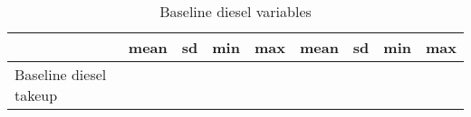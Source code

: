 \begin{table}[htbp]\centering
\def\sym#1{\ifmmode^{#1}\else\(^{#1}\)\fi}
\caption{Baseline diesel variables\label {tab1}}
\begin{tabular}{l*{2}{cccc}}
\toprule
                    &        mean&          sd&         min&         max&        mean&          sd&         min&         max\\
\midrule
\midrule
Baseline diesel takeup&            &            &            &            &            &            &            &            \\
\bottomrule
\end{tabular}
\end{table}
